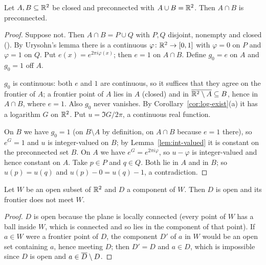\begin{theorem}\label{thm:unicoherent}
Let $A,B\subseteq\mathbb{R}^2$ be closed and preconnected with $A\cup B=\mathbb{R}^2$. Then $A\cap B$ is
preconnected.
\end{theorem}

\begin{proof}
Suppose not. Then $A\cap B=P\cup Q$ with $P,Q$ disjoint, nonempty and closed (). By
Urysohn's lemma there is a continuous $\varphi\colon\mathbb{R}^2\to[0,1]$ with $\varphi=0$ on $P$ and
$\varphi=1$ on $Q$. Put $e(x)=e^{2\pi i\varphi(x)}$; then $e=1$ on $A\cap B$. Define $g_0=e$ on $A$
and $g_0=1$ off $A$.

$g_0$ is continuous: both $e$ and $1$ are continuous, so it suffices that they agree on the frontier
of $A$; a frontier point of $A$ lies in $A$ (closed) and in $\overline{\mathbb{R}^2\setminus A}\subseteq B$, hence
in $A\cap B$, where $e=1$. Also $g_0$ never vanishes. By Corollary~\ref{cor:log-exist}(a) it has a
logarithm $G$ on $\mathbb{R}^2$. Put $u=\Im G/2\pi$, a continuous real function.

On $B$ we have $g_0=1$ (on $B\setminus A$ by definition, on $A\cap B$ because $e=1$ there), so
$e^{G}=1$ and $u$ is integer-valued on $B$; by Lemma~\ref{lem:int-valued} it is constant on the
preconnected set $B$. On $A$ we have $e^{G}=e^{2\pi i\varphi}$, so $u-\varphi$ is integer-valued and
hence constant on $A$. Take $p\in P$ and $q\in Q$. Both lie in $A$ and in $B$; so $u(p)=u(q)$ and
$u(p)-0=u(q)-1$, a contradiction.
\end{proof}


\begin{lemma}\label{lem:frontier-component}
Let $W$ be an open subset of $\mathbb{R}^2$ and $D$ a component of $W$. Then $D$ is open and its frontier
does not meet $W$.
\end{lemma}

\begin{proof}
$D$ is open because the plane is locally connected (every point of $W$ has a ball inside $W$,
which is connected and so lies in the component of that point). If $a\in W$ were a frontier point
of $D$, the component $D'$ of $a$ in $W$ would be an open set containing $a$, hence meeting $D$; then
$D'=D$ and $a\in D$, which is impossible since $D$ is open and $a\in\overline{D}\setminus D$.
\end{proof}

